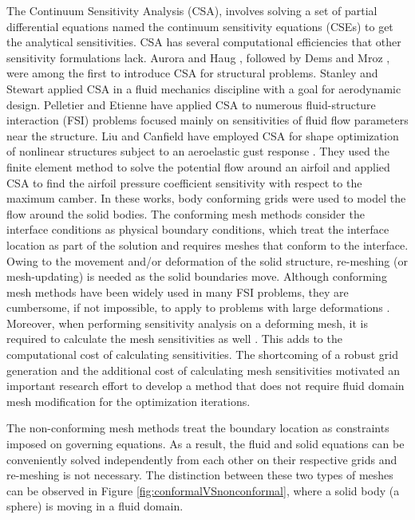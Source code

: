 \documentclass[12pt]{aiaa-pretty}
\begin{document}
The Continuum Sensitivity Analysis (CSA), involves solving a set of partial differential equations named the continuum sensitivity equations (CSEs) to get the analytical sensitivities. CSA has several computational efficiencies that other sensitivity formulations lack. Aurora and Haug \cite{Arora}, followed by Dems and Mroz \cite{Dems-Mroz}, were among the first to introduce CSA for structural problems. Stanley and Stewart \cite{stanley2002design} applied CSA in a fluid mechanics discipline with a goal for aerodynamic design. Pelletier and Etienne have applied CSA to numerous fluid-structure interaction (FSI) problems \cite{etienne2005general} focused mainly on sensitivities of fluid flow parameters near the structure. Liu and Canfield have employed CSA for shape optimization of nonlinear structures subject to an aeroelastic gust response \cite{liu2013equivalence}. They used the finite element method to solve the potential flow around an airfoil and applied CSA to find the airfoil pressure coefficient sensitivity with respect to the maximum camber. In these works, body conforming grids were used to model the flow around the solid bodies. The conforming mesh methods consider the interface conditions as physical boundary conditions, which treat the interface location as part of the solution and requires meshes that conform to the interface. Owing to the movement and/or deformation of the solid structure, re-meshing (or mesh-updating) is needed as the solid boundaries move. Although conforming mesh methods have been widely used in many FSI problems, they are cumbersome, if not impossible, to apply to problems with large deformations \cite{sahin2009arbitrary}. Moreover, when performing sensitivity analysis on a deforming mesh, it is required to calculate the mesh sensitivities as well \cite{liu2013boundary}. This adds to the computational cost of calculating  sensitivities. The shortcoming of a robust grid generation and the additional cost of calculating mesh sensitivities motivated an important research effort to develop a method that does not require fluid domain mesh modification for the optimization iterations.

The non-conforming mesh methods treat the boundary location as constraints imposed on governing equations. As a result, the fluid and solid equations can be conveniently solved independently from each other on their respective grids and re-meshing is not necessary. The distinction between these two types of meshes can be observed in Figure \ref{fig:conformalVSnonconformal}, where a solid body (a sphere) is moving in a fluid domain.
\end{document}
